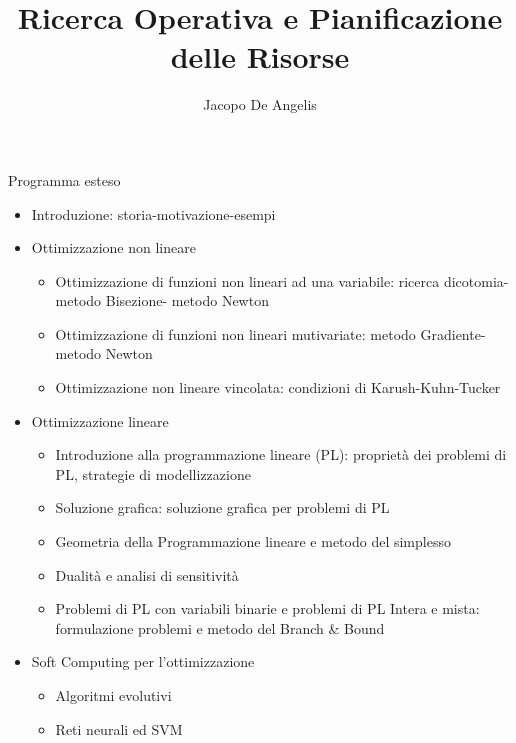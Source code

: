 \documentclass[11pt,a4paper]{book}
\begin{document}
\title{Ricerca Operativa e Pianificazione delle Risorse}
\author{Jacopo De Angelis}
\maketitle

\pagebreak
\tableofcontents
\pagebreak

\begin{LARGE}
Programma esteso
\end{LARGE}

\begin{itemize}
\item Introduzione: storia-motivazione-esempi

    \item Ottimizzazione non lineare
    \begin{itemize}
        \item Ottimizzazione di funzioni non lineari ad una variabile: ricerca dicotomia-metodo Bisezione- metodo Newton
        \item Ottimizzazione di funzioni non lineari mutivariate: metodo Gradiente-metodo Newton
        \item Ottimizzazione non lineare vincolata: condizioni di Karush-Kuhn-Tucker
    \end{itemize}

    \item Ottimizzazione lineare
    \begin{itemize}
        \item Introduzione alla programmazione lineare (PL): proprietà dei problemi di PL, strategie di modellizzazione
        \item Soluzione grafica: soluzione grafica per problemi di PL
        \item Geometria della Programmazione lineare e metodo del simplesso
        \item Dualità e analisi di sensitività
        \item Problemi di PL con variabili binarie e problemi di PL Intera e mista: formulazione problemi e metodo del Branch & Bound
    \end{itemize}

    \item Soft Computing per l'ottimizzazione
    \begin{itemize}
        \item Algoritmi evolutivi
        \item Reti neurali ed SVM
    \end{itemize}
\end{itemize}
\pagebreak
\end{document}
